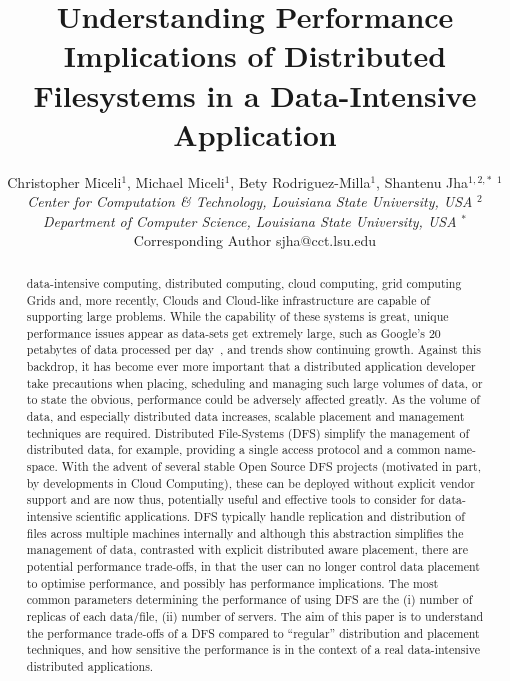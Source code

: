 \documentclass{rspublic}
\title[Understanding Performance Implications of Distributed Filesystems
in a Data-Intensive Application]{Understanding Performance Implications
of Distributed Filesystems in a Data-Intensive Application}
\author[Miceli, Miceli, Rodriguez-Milla, Jha]{ Christopher Miceli$^{1}$,
Michael Miceli$^{1}$, Bety Rodriguez-Milla$^{1}$, Shantenu Jha$^{1,2,*}$
\small{\emph{$^{1}$Center for Computation \& Technology, Louisiana State
University, USA}} \small{\emph{$^{2}$Department of Computer Science,
Louisiana State University, USA}} {\footnotesize {\hspace{0.0 in}
$^*$Corresponding Author sjha@cct.lsu.edu}} }
\newcommand{\micnote}[1]{} \newcommand{\fixme}[1]{} \fi
\begin{document}
 \maketitle

\micnote{This can't be more than 200 words. The summary should be
concise and informative. It should be complete by itself, and must not
contain references or unexplained abbreviations. It should not only
indicate the general scope of the article but also state the main
results and conclusions. Please note that footnotes are not used.}

\begin{abstract}{data-intensive computing, distributed computing, cloud
computing, grid computing} Grids and, more recently, Clouds and
Cloud-like infrastructure are capable of supporting large problems.
While the capability of these systems is great, unique performance
issues appear as data-sets get extremely large, such as Google's 20
petabytes of data processed per day~\citep{google}, and trends show
continuing growth. Against this backdrop, it has become ever more
important that a distributed application developer take precautions when
placing, scheduling and managing such large volumes of data, or to state
the obvious, performance could be adversely affected greatly. As the
volume of data, and especially distributed data increases, scalable
placement and management techniques are required.  Distributed
File-Systems (DFS) simplify the management of distributed data, for
example, providing a single access protocol and a common name-space.
With the advent of several stable Open Source DFS projects (motivated in
part, by developments in Cloud Computing), these can be deployed without
explicit vendor support and are now thus, potentially useful and
effective tools to consider for data-intensive scientific applications.
DFS typically handle replication and distribution of files across
multiple machines internally and although this abstraction simplifies
the management of data, contrasted with explicit distributed aware
placement, there are potential performance trade-offs, in that the user
can no longer control data placement to optimise performance, and
possibly has performance implications.  The most common parameters
determining the performance of using DFS are the (i) number of replicas
of each data/file, (ii) number of servers. The aim of this paper is to
understand the performance trade-offs of a DFS compared to ``regular''
distribution and placement techniques, and how sensitive the performance
is in the context of a real data-intensive distributed
applications.\end{abstract}
\end{document}
